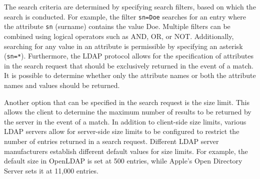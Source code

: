The search criteria are determined by specifying search filters, based on which the search is conducted. For example, the filter \texttt{sn=Doe} searches for an entry where the attribute \texttt{sn} (surname) contains the value Doe. Multiple filters can be combined using logical operators such as AND, OR, or NOT. Additionally, searching for any value in an attribute is permissible by specifying an asterisk (\eg \texttt{sn=*}). Furthermore, the LDAP protocol allows for the specification of attributes in the search request that should be exclusively returned in the event of a match. It is possible to determine whether only the attribute names or both the attribute names and values should be returned.

Another option that can be specified in the search request is the size limit. This allows the client to determine the maximum number of results to be returned by the server in the event of a match. In addition to client-side size limits, various LDAP servers allow for server-side size limits to be configured to restrict the number of entries returned in a search request. Different LDAP server manufacturers establish different default values for size limits. For example, the default size in OpenLDAP is set at 500 entries, while Apple's Open Directory Server sets it at 11,000 entries.